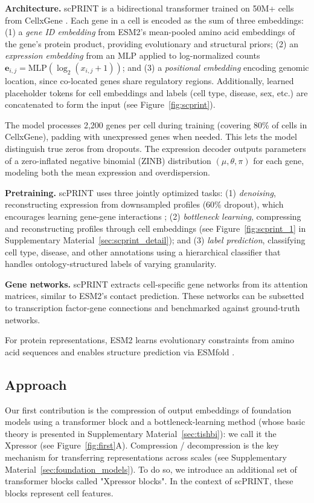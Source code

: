 \textbf{Architecture.} \gls{scPRINT} is a bidirectional transformer trained on 50M+ cells from CellxGene \citep{programCZCELLxGENEDiscover2023}. Each gene in a cell is encoded as the sum of three embeddings: (1) a \emph{gene ID embedding} from \gls{ESM}2's mean-pooled amino acid embeddings of the gene's protein product, providing evolutionary and structural priors; (2) an \emph{expression embedding} from an \gls{MLP} applied to log-normalized counts $\mathbf{e}_{i,j} = \text{MLP}(\log_2(x_{i,j} + 1))$; and (3) a \emph{positional embedding} encoding genomic location, since co-located genes share regulatory regions. Additionally, learned placeholder tokens for cell embeddings and labels (cell type, disease, sex, etc.) are concatenated to form the input (see Figure~\ref{fig:scprint}).

The model processes 2,200 genes per cell during training (covering 80\% of cells in CellxGene), padding with unexpressed genes when needed. This lets the model distinguish true zeros from dropouts. The expression decoder outputs parameters of a zero-inflated negative binomial (\gls{ZINB}) distribution $(\mu, \theta, \pi)$ for each gene, modeling both the mean expression and overdispersion.

\textbf{Pretraining.} \gls{scPRINT} uses three jointly optimized tasks: (1) \emph{denoising}, reconstructing expression from downsampled profiles (60\% dropout), which encourages learning gene-gene interactions \citep{leoteRegulatoryNetworkbasedImputation2022}; (2) \emph{bottleneck learning}, compressing and reconstructing profiles through cell embeddings (see Figure~\ref{fig:scprint_1} in Supplementary Material~\ref{sec:scprint_detail}); and (3) \emph{label prediction}, classifying cell type, disease, and other annotations using a hierarchical classifier that handles ontology-structured labels of varying granularity.

\textbf{Gene networks.} \gls{scPRINT} extracts cell-specific gene networks from its attention matrices, similar to \gls{ESM}2's contact prediction. These networks can be subsetted to transcription factor-gene connections and benchmarked against ground-truth networks.

For protein representations, \gls{ESM}2 \citep{esm2} learns evolutionary constraints from amino acid sequences and enables structure prediction via ESMfold \citep{esmfold}.

\subsection{Approach}
Our first contribution is the compression of output embeddings of foundation models using a transformer block and a bottleneck-learning method (whose basic theory is presented in Supplementary Material~\ref{sec:tishbi}): we call it the Xpressor (see Figure~\ref{fig:first}A). Compression / decompression is the key mechanism for transferring representations across scales (see Supplementary Material~\ref{sec:foundation_models}). To do so, we introduce an additional set of transformer blocks called "Xpressor blocks". In the context of \gls{scPRINT}, these blocks represent cell features.

